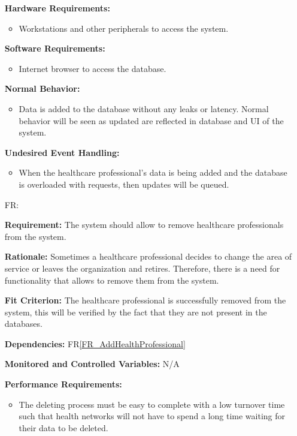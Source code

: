 \documentclass[12pt]{article}
\newcounter{reqnum} %
\begin{document}
\begin{itemize}
\textbf{Hardware Requirements:} 
\begin{itemize}
  \item Workstations and other peripherals to access the system.
\end{itemize}

\textbf{Software Requirements:} 
\begin{itemize}
  \item Internet browser to access the database.
\end{itemize}

\textbf{Normal Behavior:}
\begin{itemize}
  \item Data is added to the database without any leaks or latency. Normal behavior will be seen as updated are reflected in database and UI of the system.
\end{itemize} 

\textbf{Undesired Event Handling:}
\begin{itemize}
  \item When the healthcare professional’s data is being added and the database is overloaded with requests, then updates will be queued.
\end{itemize} 

\item[FR\refstepcounter{reqnum}\thereqnum \label{FR_RemoveHealthProfessionals}:] 

\textbf{Requirement:} The system should allow to remove healthcare professionals from the system. 

\textbf{Rationale:} Sometimes a healthcare professional decides to change the area of service or leaves the organization and retires. Therefore, there is a need for functionality that allows to remove them from the system.

\textbf{Fit Criterion:} The healthcare professional is successfully removed from the system, this will be verified by the fact that they are not present in the databases. 

\textbf{Dependencies:} FR\ref{FR_AddHealthProfessional}

\textbf{Monitored and Controlled Variables:} N/A

\textbf{Performance Requirements:}
\begin{itemize}
  \item The deleting process must be easy to complete with a low turnover time such that health networks will not have to spend a long time waiting for their data to be deleted.
\end{itemize} 


\end{itemize}
\end{document}
